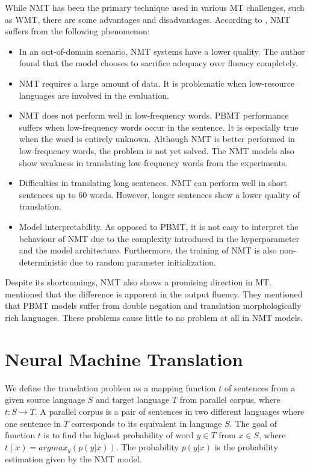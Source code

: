 While NMT has been the primary technique used in various MT challenges, such as WMT, there are some advantages and disadvantages. According to \cite{koehn2017nmt}, NMT suffers from the following phenomenon:
\begin{itemize}
    \item In an out-of-domain scenario, NMT systems have a lower quality. The author found that the model chooses to sacrifice adequacy over fluency completely.

    \item NMT requires a large amount of data. It is problematic when low-resource languages are involved in the evaluation.

    \item NMT does not perform well in low-frequency words. PBMT performance suffers when low-frequency words occur in the sentence. It is especially true when the word is entirely unknown. Although NMT is better performed in low-frequency words, the problem is not yet solved. The NMT models also show weakness in translating low-frequency words from the experiments.

    \item Difficulties in translating long sentences. NMT can perform well in short sentences up to 60 words. However, longer sentences show a lower quality of translation.

    \item Model interpretability. As opposed to PBMT, it is not easy to interpret the behaviour of NMT due to the complexity introduced in the hyperparameter and the model architecture. Furthermore, the training of NMT is also non-deterministic due to random parameter initialization.
\end{itemize}

Despite its shortcomings, NMT also shows a promising direction in MT. \cite{machavcek2018enriching} mentioned that the difference is apparent in the output fluency. They mentioned that PBMT models suffer from double negation and translation morphologically rich languages. These problems cause little to no problem at all in NMT models.

\section{Neural Machine Translation}
\label{sec:bm_nmt}
We define the translation problem as a mapping function $t$ of sentences from a given source language $S$ and target language $T$ from parallel corpus, where $t : S \rightarrow T$. A parallel corpus is a pair of sentences in two different languages where one sentence in $T$ corresponds to its equivalent in language $S$. The goal of function $t$ is to find the highest probability of word $y \in T$ from $x \in S$, where $t(x) = argmax_y(p(y|x))$. The probability $p(y|x)$ is the probability estimation given by the NMT model.

